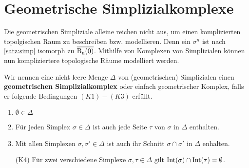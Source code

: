 
\section{Geometrische Simplizialkomplexe}

Die geometrischen Simpliziale alleine reichen nicht aus, um einen
komplizierten topolgischen Raum zu beschreiben bzw. modellieren. Denn
ein $\sigma^n$ ist nach \cref{satz:simp} isomorph zu $\operatorname{\overline{\operatorname{B}_{n}(0)}}$.  Mithilfe
von Komplexen von Simplizialen können nun kompliziertere topologische
Räume modelliert werden.

\begin{Def}
  Wir nennen eine nicht leere Menge $\Delta$ von (geometrischen) Simplizialen
  einen \textbf{geometrischen Simplizialkomplex} oder einfach
  geometrischer Komplex, falls er folgende Bedingungen $(K1) - (K3)$
  erfüllt.
  \begin{enumerate}[(K1)]
  \item $\emptyset \in \Delta$
  \item Für jeden Simplex $\sigma \in \Delta$ ist auch jede Seite
    $\tau$ von $\sigma$ in $\Delta$ enthalten.
  \item Mit allen Simplexen $\sigma, \sigma' \in \Delta$ ist auch ihr
    Schnitt $\sigma \cap \sigma'$ in $\Delta$ enhalten.
  \item[(K4)] Für zwei verschiedene Simplexe $\sigma,\tau \in \Delta$
    gilt $\operatorname{Int}(\sigma) \cap \operatorname{Int}(\tau) = \emptyset$.
  \end{enumerate}
\end{Def}


